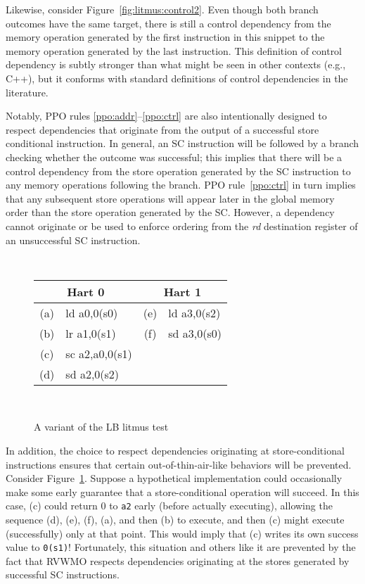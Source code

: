 Likewise, consider Figure~\ref{fig:litmus:control2}.
Even though both branch outcomes have the same target, there is still a control dependency from the memory operation generated by the first instruction in this snippet to the memory operation generated by the last instruction.
This definition of control dependency is subtly stronger than what might be seen in other contexts (e.g., C++), but it conforms with standard definitions of control dependencies in the literature.

Notably, PPO rules \ref{ppo:addr}--\ref{ppo:ctrl} are also intentionally designed to respect dependencies that originate from the output of a successful store conditional instruction.
In general, an SC instruction will be followed by a branch checking whether the outcome was successful; this implies that there will be a control dependency from the store operation generated by the SC instruction to any memory operations following the branch.
PPO rule~\ref{ppo:ctrl} in turn implies that any subsequent store operations will appear later in the global memory order than the store operation generated by the SC.
However, a dependency cannot originate or be used to enforce ordering from the {\em rd} destination register of an unsuccessful SC instruction.

\begin{figure}[h!]
  \center
  {
    \tt\small
    \begin{tabular}{cl||cl}
    \multicolumn{2}{c}{Hart 0} & \multicolumn{2}{c}{Hart 1} \\
    \hline
      (a) & ld a0,0(s0)    & (e) & ld a3,0(s2) \\
      (b) & lr a1,0(s1)    & (f) & sd a3,0(s0) \\
      (c) & sc a2,a0,0(s1) &                    \\
      (d) & sd a2,0(s2)    &                    \\
    \end{tabular}
  }
  ~~~~
  \diagram
  \caption{A variant of the LB litmus test}
  \label{fig:litmus:successdeps}
\end{figure}

In addition, the choice to respect dependencies originating at store-conditional instructions ensures that certain out-of-thin-air-like behaviors will be prevented.
Consider Figure~\ref{fig:litmus:successdeps}.
Suppose a hypothetical implementation could occasionally make some early guarantee that a store-conditional operation will succeed.
In this case, (c) could return 0 to {\tt a2} early (before actually executing), allowing the sequence (d), (e), (f), (a), and then (b) to execute, and then (c) might execute (successfully) only at that point.
This would imply that (c) writes its own success value to {\tt 0(s1)}!
Fortunately, this situation and others like it are prevented by the fact that RVWMO respects dependencies originating at the stores generated by successful SC instructions.

